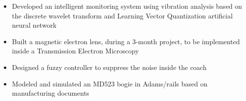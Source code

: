 \documentclass[10pt,letterpaper,ragged2e,compact]{mocv}
\begin{document}
\begin{paracol}{2}
    \begin{itemize}
        \item Developed an intelligent monitoring system using vibration analysis based on the discrete wavelet transform and Learning Vector Quantization artificial neural network
    \end{itemize}
    \divider
    \begin{itemize}
        \item  Built a magnetic electron lens, during a 3-month project, to be implemented inside a Transmission Electron Microscopy
    \end{itemize}
    \divider
    \begin{itemize}
        \item Designed a fuzzy controller to suppress the noise inside the coach
    \end{itemize}
    \divider
    \begin{itemize}
        \item Modeled and simulated an MD523 bogie in Adams/rails based on manufacturing documents
    \end{itemize}


\end{paracol}
\end{document}
